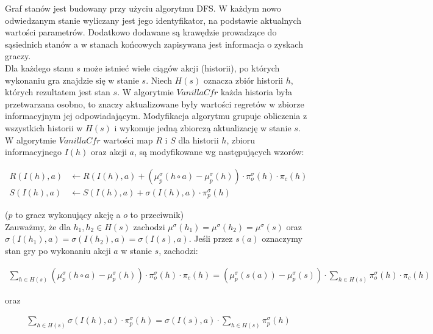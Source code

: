 \documentclass[licencjacka]{pracamgr}
\begin{document}
\noindent
Graf stanów jest budowany przy użyciu algorytmu DFS. W każdym nowo odwiedzanym stanie
wyliczany jest jego identyfikator, na podstawie aktualnych wartości parametrów. Dodatkowo dodawane
są krawędzie prowadzące do sąsiednich stanów a w stanach końcowych zapisywana jest informacja o
zyskach graczy. \\

\noindent
Dla każdego stanu $s$ może istnieć wiele ciągów akcji (historii), po których wykonaniu gra
znajdzie się w stanie $s$. Niech $H(s)$ oznacza zbiór historii $h$, których rezultatem jest stan $s$.
W algorytmie $VanillaCfr$ każda historia była przetwarzana osobno, to znaczy aktualizowane były wartości
regretów w zbiorze informacyjnym jej odpowiadającym. Modyfikacja algorytmu grupuje obliczenia z
wszystkich historii w $H(s)$ i wykonuje jedną zbiorczą aktualizację w stanie $s$. \\

\noindent
W algorytmie $VanillaCfr$ wartości map $R$ i $S$ dla historii $h$, zbioru informacyjnego $I(h)$ oraz akcji $a$, są modyfikowane
wg następujących wzorów:

\begin{align*}
R(I(h), a) &\leftarrow R(I(h), a) + (\mu_p^{\sigma}(h \circ a) - \mu_p^{\sigma}(h)) \cdot \pi_{o}^{\sigma}(h) \cdot \pi_c(h) \\
S(I(h), a) &\leftarrow S(I(h), a) + \sigma(I(h), a) \cdot \pi_p^{\sigma}(h)
\end{align*}

\noindent
($p$ to gracz wykonujący akcję a $o$ to przeciwnik) \\

\noindent
Zauważmy, że dla $h_1, h_2 \in H(s)$ zachodzi $\mu^{\sigma}(h_1) = \mu^{\sigma}(h_2) = \mu^{\sigma}(s)$ oraz
$\sigma(I(h_1), a) = \sigma(I(h_2), a) = \sigma(I(s), a). $
Jeśli przez $s(a)$ oznaczymy stan gry po wykonaniu akcji $a$ w stanie $s$, zachodzi: 

\begin{align*}
\sum\limits_{h \in H(s)} (\mu_p^{\sigma}(h \circ a) - \mu_p^{\sigma}(h)) \cdot \pi_o^{\sigma}(h) \cdot \pi_c(h) =
(\mu_p^{\sigma}(s(a)) - \mu_p^{\sigma}(s)) \cdot \sum\limits_{h \in H(s)} \pi_o^{\sigma}(h) \cdot \pi_c(h)
\end{align*}

\noindent
oraz

\begin{align*}
\sum\limits_{h \in H(s)} \sigma(I(h), a) \cdot \pi_p^{\sigma}(h) =
\sigma(I(s), a) \cdot \sum\limits_{h \in H(s)} \pi_p^{\sigma}(h)
\end{align*}
\end{document}
